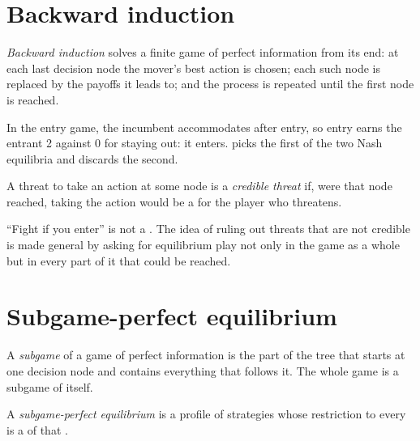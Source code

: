 \section{Backward induction}\label{sec:b2:dynamic-games:backward}

\begin{definition}\label{def:b2:dynamic-games:backward-induction}
\emph{Backward induction} solves a finite game of perfect information from its
end: at each last decision node the mover's best action is chosen; each such node is replaced by the
payoffs it leads to; and the process is repeated until the first node is reached.
\end{definition}

In the entry game, the incumbent accommodates after entry, so entry earns the entrant 2 against 0 for
staying out: it enters.  picks the first of the two Nash equilibria and discards the
second.

\begin{definition}\label{def:b2:dynamic-games:credible-threat}
A threat to take an action at some node is a \emph{credible threat} if, were that
node reached, taking the action would be a  for the player who threatens.
\end{definition}

``Fight if you enter'' is not a . The idea of ruling out threats that are not credible is
made general by asking for equilibrium play not only in the game as a whole but in every part of it that
could be reached.

\section{Subgame-perfect equilibrium}\label{sec:b2:dynamic-games:spe}

\begin{definition}[Subgame]\label{def:b2:dynamic-games:subgame}
A \emph{subgame} of a game of perfect information is the part of the tree that starts at one
decision node and contains everything that follows it. The whole game is a subgame of itself.
\end{definition}

\begin{definition}\label{def:b2:dynamic-games:spe}
A \emph{subgame-perfect equilibrium} is a profile of strategies whose
restriction to every  is a  of that .
\end{definition}

